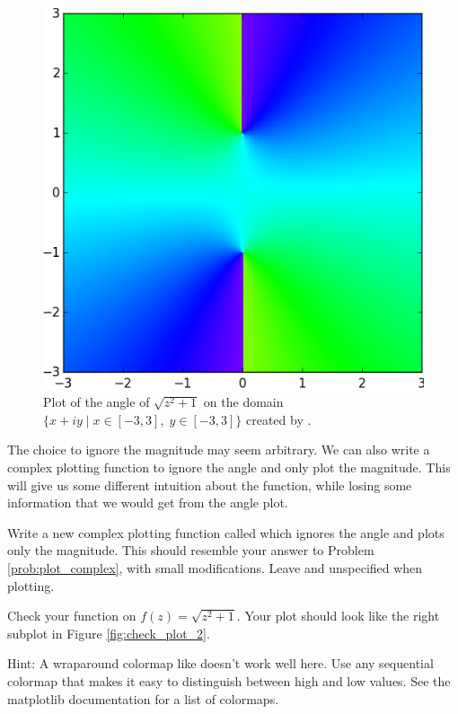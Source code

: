 \begin{figure}[H]
\includegraphics[width=.6\textwidth]{check_plot.png}
\caption{Plot of the angle of $\sqrt{z^2+1}$ on the domain $\{x+iy \mid x \in [-3,3] , \; y \in [-3,3]\}$ created by .}
\label{fig:check_plot}
\end{figure}

The choice to ignore the magnitude may seem arbitrary. 
We can also write a complex plotting function to ignore the angle and only plot the magnitude.
This will give us some different intuition about the function, while losing some information that we would get from the angle plot.

\begin{problem}
Write a new complex plotting function called  which ignores the angle and plots only the magnitude.
This should resemble your answer to Problem \ref{prob:plot_complex}, with small modifications.
Leave  and  unspecified when plotting.

Check your function on $f(z) = \sqrt{z^2+1}$. Your plot should look like the right subplot in Figure \ref{fig:check_plot_2}.

Hint: A wraparound colormap like  doesn't work well here. 
Use any sequential colormap that makes it easy to distinguish between high and low values. See the matplotlib documentation for a list of colormaps.

\end{problem}

